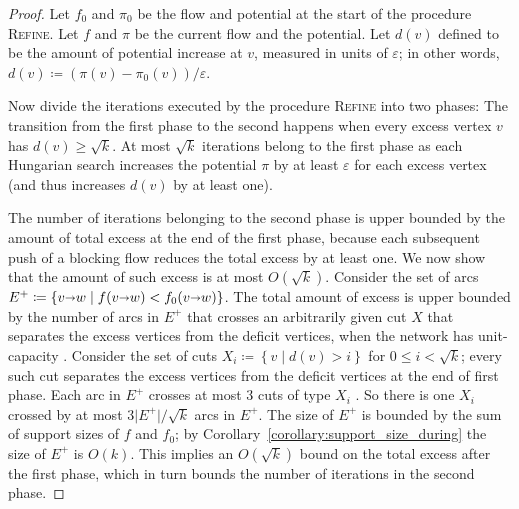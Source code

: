\documentclass[a4paper,UKenglish]{socg-lipics-v2018}
\makeatletter
\def\note#1{\textcolor{red}{{#1}}}
\def\etal{\emph{et~al.}}
\def\etal{\textit{et~al.}}
\def\eps{\varepsilon}
\def\abs#1{\mathopen| #1 \mathclose|}		%
\def\Set#1{\left\{ #1 \right\}}
\def\arcto{\mathord\shortrightarrow}
\def\arc#1#2{#1\arcto#2}
\theoremstyle{plain}
\numberwithin{figure}{section}
\def\EMPH#1{\textbf{\emph{\boldmath #1}}}
\def\n@te#1{\textsf{\boldmath \textbf{$\langle\!\langle$#1$\rangle\!\rangle$}}\leavevmode}
\def\note#1{\textcolor{red}{\n@te{#1}}}
\makeatother
\begin{document}
\begin{proof}
Let $f_0$ and $\pi_0$ be the flow and potential at the start of the procedure \textsc{Refine}.  Let $f$ and $\pi$ be the current flow and the potential.
Let \EMPH{$d(v)$} defined to be the amount of potential increase at $v$, measured in units of $\eps$; in other words, $d(v) \coloneqq (\pi(v) - \pi_0(v)) / \eps$.
%

Now divide the iterations executed by
the procedure \textsc{Refine}
into two phases:  The transition from the first phase to the second happens when every excess vertex $v$ has $d(v) \ge \sqrt{k}$.
%
At most $\sqrt{k}$ iterations belong to
the first phase as each Hungarian search increases the potential $\pi$ by at least $\eps$ for each excess vertex (and thus increases $d(v)$ by at least one).

The number of iterations
belonging to the second phase is upper bounded by the amount of total excess at the end of the first phase, because each subsequent push of a blocking flow reduces the total excess by at least one.  We now show that the amount of such excess is at most $O(\sqrt{k})$.
%
Consider the set of arcs $E^+ \coloneqq \Set{\arc vw \mid f(\arc vw) < f_0(\arc vw)}$.
The total amount of excess is upper bounded by the number of arcs in $E^+$ that crosses an arbitrarily given cut $X$ that separates the excess vertices from the deficit vertices, when the network has unit-capacity \cite[Lemma~3.6]{GHKT17}.
%
Consider the set of cuts $X_i \coloneqq \Set{v \mid d(v) > i}$ for $0 \le i < \sqrt{k}$; every such cut separates the excess vertices from the deficit vertices at the end of first phase.
Each arc in $E^+$ crosses at most $3$ cuts of type $X_i$ \cite[Lemma~3.1]{GHKT17}.  So there is one $X_i$ crossed by at most $3\abs{E^+}/\sqrt{k}$ arcs in $E^+$.
%
The size of $E^+$ is bounded by the sum of support sizes of $f$ and $f_0$; by Corollary~\ref{corollary:support_size_during} the size of $E^+$ is $O(k)$.
This implies an $O(\sqrt{k})$ bound on the total excess after the first phase, which in turn bounds the number of iterations in the second phase.
\end{proof}
\end{document}
